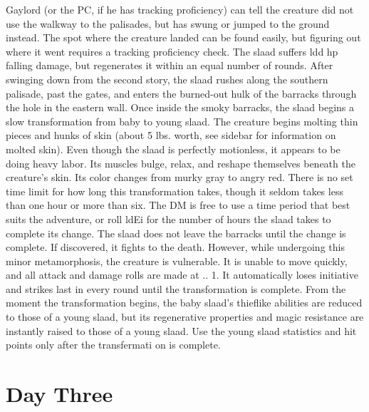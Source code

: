 \documentclass[a5paper,11pt,twoside]{book}
\begin{document}
{{{Gaylord (or the PC, if he has tracking proficiency) can tell the creature did not use the walkway to the palisades, but has swung or jumped to the ground instead.
The spot where the creature landed can be found easily, but figuring out where it went requires a tracking proficiency check.
The slaad suffers ldd hp falling damage, but regenerates it within an equal number of rounds.
After swinging down from the second story, the slaad rushes along the southern palisade, past the gates, and enters the burned-out hulk of the barracks through the hole in the eastern wall.
Once inside the smoky barracks, the slaad begins a slow transformation from baby to young slaad.
The creature begins molting thin pieces and hunks of skin (about 5 lbs.
worth, see sidebar for  information on molted skin).
Even though the slaad is perfectly motionless, it appears to be doing heavy labor.
Its muscles bulge, relax, and reshape themselves beneath the creature’s skin.
Its color changes from murky gray to angry red.
There is no set time limit for how long this transformation takes, though it seldom takes less than one hour or more than six.
The DM is free to use a time period that best suits the adventure, or roll ldEi for the number of hours the slaad takes to complete its change.
The slaad does not leave the barracks until the change is complete.
If discovered, it fights to the death.
However, while undergoing this minor metamorphosis, the creature is vulnerable.
It is unable to move quickly, and all attack and damage rolls are made at ..
1.
It automatically loses initiative and strikes last in every round until the transformation is complete.
From the moment the transformation begins, the baby slaad’s thieflike abilities are reduced to those of a young slaad, but its regenerative properties and magic resistance are instantly raised to those of a young slaad.
Use the young slaad statistics and hit points only after the transfermati on is complete.
\chapter{Day Three} 

}}}
\end{document}
